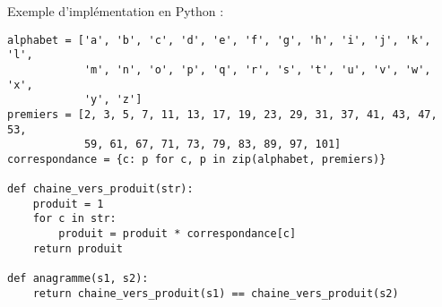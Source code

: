 \documentclass{article}%
\begin{document}
Exemple d'implémentation en Python :
\begin{verbatim}
alphabet = ['a', 'b', 'c', 'd', 'e', 'f', 'g', 'h', 'i', 'j', 'k', 'l',
            'm', 'n', 'o', 'p', 'q', 'r', 's', 't', 'u', 'v', 'w', 'x',
            'y', 'z']
premiers = [2, 3, 5, 7, 11, 13, 17, 19, 23, 29, 31, 37, 41, 43, 47, 53,
            59, 61, 67, 71, 73, 79, 83, 89, 97, 101]
correspondance = {c: p for c, p in zip(alphabet, premiers)}

def chaine_vers_produit(str):
    produit = 1
    for c in str:
        produit = produit * correspondance[c]
    return produit

def anagramme(s1, s2):
    return chaine_vers_produit(s1) == chaine_vers_produit(s2)    
\end{verbatim}
\end{document}
